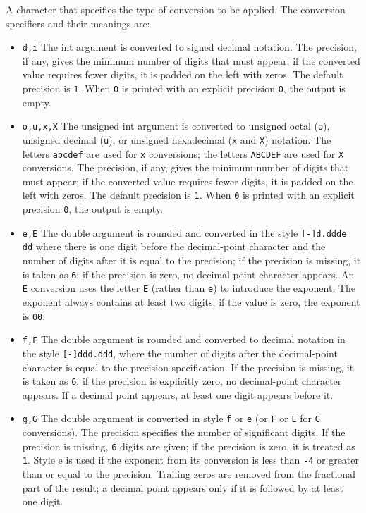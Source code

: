 A character that specifies the type of conversion to be  applied.   The
conversion specifiers and their meanings are:
\begin{itemize}
\item  \verb|d,i|   The  int  argument is converted to signed decimal notation.  The  precision, if any, gives the minimum number of digits that  must   appear;  if  the  converted  value  requires fewer digits, it is    padded on the left with zeros. The default precision is \verb|1|.  When \verb|0|  is printed with an explicit precision \verb|0|, the output is empty.

\item  \verb|o,u,x,X|   The unsigned int argument is converted to  unsigned  octal  (\verb|o|),  unsigned  decimal  (\verb|u|),  or unsigned hexadecimal (\verb|x| and \verb|X|) notation.  The letters \verb|abcdef| are used for \verb|x| conversions;  the  letters \verb|ABCDEF| are used for \verb|X| conversions.  The precision, if any,  gives the minimum number of digits that must appear; if the converted  value  requires  fewer  digits, it is padded on the left  with zeros. The default precision is \verb|1|.  When \verb|0| is printed  with  an explicit precision \verb|0|, the output is empty.

\item  \verb|e,E|    The  double  argument  is  rounded  and  converted  in the style  \verb|[-]d.ddde dd| where there is one digit before  the  decimal-point  character and the number of digits after it is equal to the precision; if the precision is missing, it is taken as  \verb|6|;  if  the    precision  is  zero,  no  decimal-point character appears.  An \verb|E|  conversion uses the letter \verb|E| (rather than \verb|e|)  to  introduce  the  exponent.   The exponent always contains at least two digits; if  the value is zero, the exponent is \verb|00|.

\item  \verb|f,F|   The double argument is rounded and converted to decimal notation  in  the  style  \verb|[-]ddd.ddd|, where the number of digits after the decimal-point character is equal to the precision specification.  If  the precision is missing, it is taken as \verb|6|; if the precision  is explicitly zero, no decimal-point character  appears.   If  a   decimal point appears, at least one digit appears before it.

\item  \verb|g,G|   The double argument is converted in style \verb|f| or \verb|e| (or \verb|F| or \verb|E|  for  \verb|G|  conversions).  The precision specifies the number of significant digits.  If the precision is missing, \verb|6| digits  are  given;  if  the  precision is zero, it is treated as \verb|1|.  Style e is used   if the exponent from its conversion is less than \verb|-4|  or  greater than or equal to the precision.  Trailing zeros are removed from  the fractional part of the result; a decimal point appears  only  if it is followed by at least one digit.


\end{itemize}
